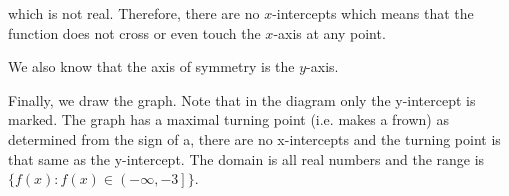           \label{m39345*id245588}which is not real. Therefore, there are no $x$-intercepts which means that the function does not cross or even touch the $x$-axis at any point.\par 
          \label{m39345*id245613}We also know that the axis of symmetry is the $y$-axis.\par 
          \label{m39345*eip-782}Finally, we draw the graph. Note that in the diagram only the y-intercept is marked. The graph has a maximal turning point (i.e. makes a frown) as determined from the sign of a, there are no x-intercepts and the turning point is that same as the y-intercept. The domain is all real numbers and the range is $\{f\left(x\right):f\left(x\right)\in \left(-\infty ,-3\right]\}$.\par 
    \setcounter{subfigure}{0}
